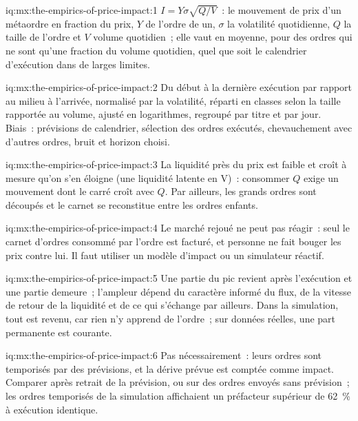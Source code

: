 \begin{solution}{iq:mx:the-empirics-of-price-impact:1}
$I=Y\sigma\sqrt{Q/V}$~: le mouvement de prix d'un métaordre en fraction du prix, $Y$ de l'ordre de un, $\sigma$ la volatilité quotidienne, $Q$ la taille de l'ordre et $V$
volume quotidien~; elle vaut en moyenne, pour des ordres qui ne sont qu'une fraction du volume quotidien, quel que soit le calendrier d'exécution dans de larges limites.
\end{solution}

\begin{solution}{iq:mx:the-empirics-of-price-impact:2}
Du début à la dernière exécution par rapport au milieu à l'arrivée, normalisé par la volatilité, réparti en classes selon la taille rapportée au volume, ajusté en logarithmes, regroupé par titre et par jour. Biais~:
prévisions de calendrier, sélection des ordres exécutés, chevauchement avec d'autres ordres, bruit et horizon choisi.
\end{solution}

\begin{solution}{iq:mx:the-empirics-of-price-impact:3}
La liquidité près du prix est faible et croît à mesure qu'on s'en éloigne (une liquidité latente en V)~: consommer $Q$ exige un mouvement dont le carré croît avec $Q$. Par ailleurs,
les grands ordres sont découpés et le carnet se reconstitue entre les ordres enfants.
\end{solution}

\begin{solution}{iq:mx:the-empirics-of-price-impact:4}
Le marché rejoué ne peut pas réagir~: seul le carnet d'ordres consommé par l'ordre est facturé, et personne ne fait bouger les prix contre lui. Il faut utiliser un modèle d'impact ou un
simulateur réactif.
\end{solution}

\begin{solution}{iq:mx:the-empirics-of-price-impact:5}
Une partie du pic revient après l'exécution et une partie demeure~; l'ampleur dépend du caractère informé du flux, de la vitesse de retour de la liquidité et de ce qui s'échange par ailleurs.
Dans la simulation, tout est revenu, car rien n'y apprend de l'ordre~; sur données réelles, une part permanente est courante.
\end{solution}

\begin{solution}{iq:mx:the-empirics-of-price-impact:6}
Pas nécessairement~: leurs ordres sont temporisés par des prévisions, et la dérive prévue est comptée comme impact. Comparer après retrait de la prévision, ou sur des ordres envoyés
sans prévision~; les ordres temporisés de la simulation affichaient un préfacteur supérieur de 62~\% à exécution identique.
\end{solution}
